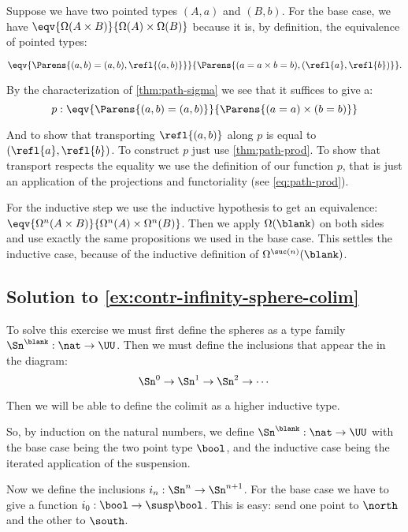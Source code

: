 \documentclass[
%
%
11pt %
]{article}
\begin{document}
Suppose we have two pointed types $(A,a)$ and $(B,b)$.
For the base case, we have $\eqv{\Omega(A \times B)}{\Omega(A) \times \Omega(B)}$
because it is, by definition, the equivalence of pointed types:

\[\eqv{ \Parens{(a,b)=(a,b), \refl{(a,b)}} }{\Parens{(a=a \times b=b), (\refl{a}, \refl{b})}}.\]

By the characterization of \cref{thm:path-sigma} we see
that it suffices to give a:
\[p:\eqv{\Parens{(a,b)=(a,b)}}{\Parens{(a=a)\times (b=b)}}\]

And to show that transporting $\refl{(a,b)}$ along $p$ is equal to
$(\refl{a}, \refl{b})$.  To construct $p$ just use \cref{thm:path-prod}. To
show that transport respects the equality we use
the definition
of our function $p$, that is just an application of the projections and
functoriality (see \cref{eq:path-prod}).

For the inductive step we use the inductive hypothesis to get an equivalence:
$\eqv{\Omega^n(A \times B)}{\Omega^n(A) \times \Omega^n(B)}$.
Then we apply $\Omega(\blank)$ on both sides and use exactly the same
propositions we used in the base
case. This settles the inductive case, because of the inductive definition of
$\Omega^{\suc(n)}(\blank)$.


\subsection*{Solution to \cref{ex:contr-infinity-sphere-colim}}

To solve this exercise we must first define the spheres as a type family
$\Sn^{\blank} : \nat \to \UU$.
Then we must define the inclusions that appear the in the diagram:
\[ \Sn^0 \to \Sn^1 \to \Sn^2 \to\cdots \]

Then we will be able to define the colimit as
a higher inductive type.

So, by induction on the natural numbers, we define $\Sn^{\blank} : \nat \to \UU$
with the base case being the two point type $\bool$, and the inductive case
being the iterated application of the suspension.

Now we define the inclusions $i_n : \Sn^n \to \Sn^{n+1}$.
For the base case we have to give a function $i_0 : \bool \to \susp \bool$.
This is easy: send one point to $\north$ and the other to $\south$.
\end{document}
